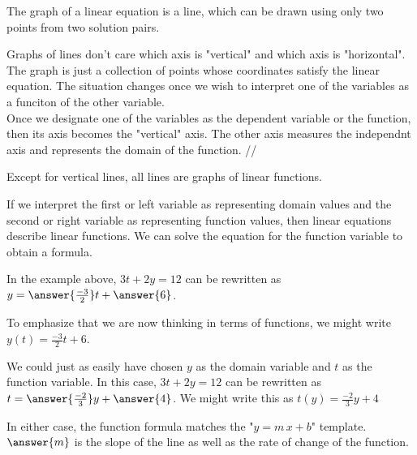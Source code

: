 \documentclass{ximera}
\begin{document}
\begin{example}
\begin{image}
\end{image}

The graph of a linear equation is a line, which can be drawn using only two points from two solution pairs.














\end{example}

Graphs of lines don't care which axis is "vertical" and which axis is "horizontal".  The graph is just a collection of points whose coordinates satisfy the linear equation.  The situation changes once we wish to interpret one of the variables as a funciton of the other variable. \\




Once we designate one of the variables as the dependent variable or the function, then its axis becomes the "vertical" axis.  The other axis measures the independnt axis and represents the domain of the function. //


Except for vertical lines, all lines are graphs of linear functions. \\



\begin{explanation}
If we interpret the first or left variable as representing domain values and the second or right variable as representing function values, then linear equations describe linear functions.  We can solve the equation for the function variable to obtain a formula.



In the example above, $3 t + 2 y = 12$ can be rewritten as $y = \answer{\frac{-3}{2}} t + \answer{6}$.

To emphasize that we are now thinking in terms of functions, we might write $y(t) = \tfrac{-3}{2} t + 6$.




We could just as easily have chosen $y$ as the domain variable and $t$ as the function variable.  In this case, $3 t + 2 y = 12$ can be rewritten as $t = \answer{\frac{-2}{3}} y + \answer{4}$.  We might write this as $t(y) = \tfrac{-2}{3} y + 4$




In either case, the function formula matches the "$y = m \, x + b$" template.  $\answer{m}$ is the slope of the line as well as the rate of change of the function.


\end{explanation}
\end{document}
